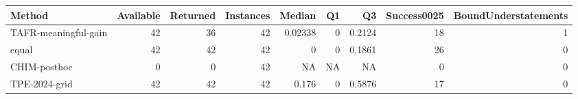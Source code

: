 \begin{tabular}{lrrrrrrrr}
\toprule
Method & Available & Returned & Instances & Median & Q1 & Q3 & Success0025 & BoundUnderstatements \\
\midrule
TAFR-meaningful-gain & 42 & 36 & 42 & 0.02338 & 0 & 0.2124 & 18 & 1 \\
equal & 42 & 42 & 42 & 0 & 0 & 0.1861 & 26 & 0 \\
CHIM-posthoc & 0 & 0 & 42 & NA & NA & NA & 0 & 0 \\
TPE-2024-grid & 42 & 42 & 42 & 0.176 & 0 & 0.5876 & 17 & 0 \\
\bottomrule
\end{tabular}
